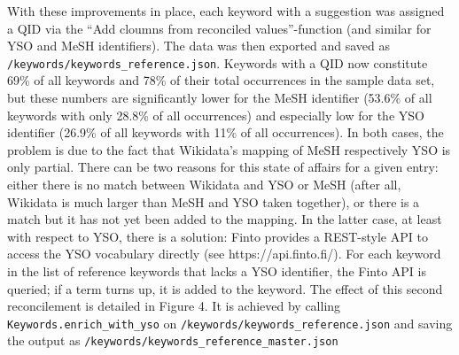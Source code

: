 With these improvements in place, each keyword with a suggestion was
assigned a QID via the ``Add cloumns from reconciled values''-function
(and similar for YSO and MeSH identifiers). The data was then exported
and saved as \texttt{/keywords/keywords\_reference.json}. Keywords with
a QID now constitute 69\% of all keywords and 78\% of their total
occurrences in the sample data set, but these numbers are significantly
lower for the MeSH identifier (53.6\% of all keywords with only 28.8\%
of all occurrences) and especially low for the YSO identifier (26.9\% of
all keywords with 11\% of all occurrences). In both cases, the problem
is due to the fact that Wikidata's mapping of MeSH respectively YSO is
only partial. There can be two reasons for this state of affairs for a
given entry: either there is no match between Wikidata and YSO or MeSH
(after all, Wikidata is much larger than MeSH and YSO taken together),
or there is a match but it has not yet been added to the mapping. In the
latter case, at least with respect to YSO, there is a solution: Finto
provides a REST-style API to access the YSO vocabulary directly (see
https://api.finto.fi/). For each keyword in the list of reference
keywords that lacks a YSO identifier, the Finto API is queried; if a
term turns up, it is added to the keyword. The effect of this second
reconcilement is detailed in Figure 4. It is achieved by calling
\texttt{Keywords.enrich\_with\_yso} on
\texttt{/keywords/keywords\_reference.json} and saving the output as
\texttt{/keywords/keywords\_reference\_master.json}

\begin{Shaded}
\begin{Highlighting}[]
\OperatorTok{=}\NormalTok{)}
\OperatorTok{=}
\NormalTok{)}
\end{Highlighting}
\end{Shaded}

